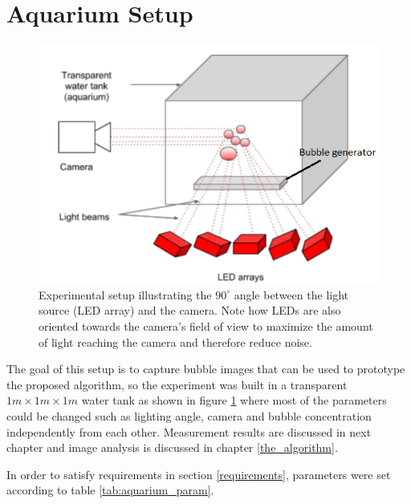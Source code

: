 	\section{Aquarium Setup}
		\begin{figure}
			\centering
			\includegraphics[scale=1]{images/aquarium_setup}
			\caption{Experimental setup illustrating the $90^\circ$ angle between the light source (LED array) and the camera. Note how LEDs are also oriented towards the camera's field of view to maximize the amount of light reaching the camera and therefore reduce noise.}
			\label{fig:aquarium_setup}
		\end{figure}			
		
		The goal of this setup is to capture bubble images that can be used to prototype the proposed algorithm, so the experiment was built in a transparent $1m \times 1m \times 1m$ water tank as shown in figure \ref{fig:aquarium_setup} where most of the parameters could be changed such as lighting angle, camera and bubble concentration independently from each other. Measurement results are discussed in next chapter and image analysis is discussed in chapter \ref{the_algorithm}.
		
		In order to satisfy requirements in section \ref{requirements}, parameters were set according to table \ref{tab:aquarium_param}. 
		
